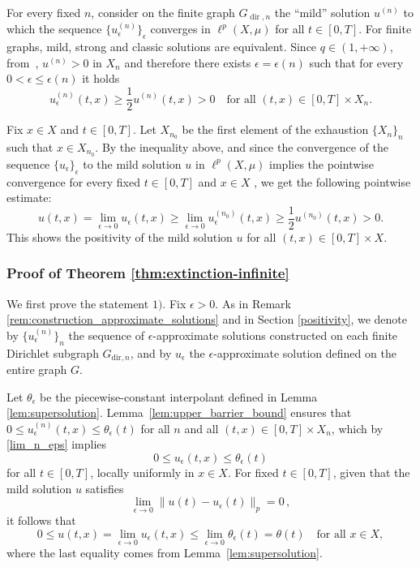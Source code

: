 \documentclass[journal]{article}
\theoremstyle{nonitalic}
\theoremstyle{nonitalic}
\theoremstyle{plain} %
\numberwithin{equation}{section}
\begin{document}
For every fixed $n$, consider on the finite graph $G_{\operatorname{dir},n}$ the ``mild'' solution $u^{(n)}$ to which the sequence $\{u_\epsilon^{(n)}\}_{\epsilon}$ converges in $\ell^p(X,\mu)$ for all $t\in [0,T]$. For finite graphs, mild, strong and classic solutions are equivalent. Since $q\in (1,+\infty)$, from~\cite[Theorems 4.7-4.8]{chung2011extinction}, $u^{(n)} >0$ in $X_n$ and therefore there exists $\epsilon = \epsilon(n)$ such that for every $0<\epsilon \leq \epsilon(n)$ it holds
$$
u^{(n)}_\epsilon (t,x) \geq\frac{1}{2}  u^{(n)} (t,x) > 0 \quad \text{for all } (t,x)\in [0,T]\times  X_n. 
$$

 Fix $x\in X$ and $t\in[0,T]$. Let $X_{n_0}$ be the first element of the exhaustion $\{X_n\}_n$ such that $x\in X_{n_0}$. By the inequality above, and since the convergence of the sequence $\{u_\epsilon\}_{\epsilon}$ to the mild solution $u$ in $\ell^p(X,\mu)$ implies the pointwise convergence for every fixed $t\in [0,T]$ and $x\in X$ , we get the following pointwise estimate:
$$
u(t,x) = \lim_{\epsilon\rightarrow 0} u_{\epsilon} (t,x)\geq \lim_{\epsilon\rightarrow 0} u^{(n_0)}_{\epsilon} (t,x) \geq \frac{1}{2} u^{(n_0)}(t,x) >0.
$$
This shows the positivity of the mild solution $u$ for all $(t,x)\in [0,T]\times X$.

 


\subsubsection{Proof of Theorem \ref{thm:extinction-infinite}}\label{TH63proof}

We first prove the statement $1)$. Fix $\epsilon > 0$. As in Remark \ref{rem:construction_approximate_solutions} and in Section \ref{positivity}, we denote by $\{u_\epsilon^{(n)}\}_n$ the sequence of $\epsilon$-approximate solutions constructed on each finite Dirichlet subgraph $G_{\mathrm{dir},n}$, and by $u_\epsilon$ the $\epsilon$-approximate solution defined on the entire graph $G$.


Let $\theta_\epsilon$ be the piecewise-constant interpolant defined in Lemma \ref{lem:supersolution}. Lemma~\ref{lem:upper_barrier_bound} ensures that $0 \leq u_\epsilon^{(n)}(t,x) \leq \theta_\epsilon(t)$ for all $n$ and all $(t,x)\in [0,T]\times  X_n$, which by \eqref{lim_n_eps} implies
$$
0\leq u_\epsilon(t,x) \leq \theta_\epsilon(t)$$
for all $t\in [0,T]$, locally uniformly in $x\in X$. For fixed $t\in [0,T]$, given that the mild solution $u$ satisfies
$$
\lim_{\epsilon \to 0} \| u(t) - u_\epsilon(t) \|_p = 0 \,,
$$
it follows that
$$
0\leq u(t,x) = \lim_{\epsilon \to 0} u_\epsilon(t,x) \leq \lim_{\epsilon \to 0} \theta_\epsilon(t) = \theta(t) \quad \text{for all } x \in X,
$$
where the last equality comes from Lemma~\ref{lem:supersolution}.
\end{document}
